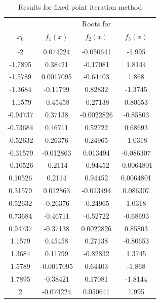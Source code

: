 \documentclass[11pt]{article}
\newcommand{\1}{\mathbbm{1}}
\begin{document}
	\begin{table}[H]
	\small
	\centering
	\begin{tabular}{c| c c c  }
		\hline
		\hline
				&\multicolumn{3}{c}{Roots for }\\
$x_{0}$      & $f_{1}(x)$      &$f_{2}(x)$      &$f_{3}(x)$      \\
\hline
&               &              &              \\
-2&      0.074224 &    -0.050641 &       -1.995 \\
-1.7895&       0.38421 &     -0.17081 &       1.8144 \\
-1.5789&     0.0017095 &     -0.64403 &        1.868 \\
-1.3684&      -0.11799 &      0.82832 &      -1.3745 \\
-1.1579&      -0.45458 &     -0.27138 &      0.80653 \\
-0.94737&       0.37138 &   -0.0022826 &     -0.85803 \\
-0.73684&       0.46711 &      0.52722 &      0.68693 \\
-0.52632&       0.26376 &      0.24965 &      -1.0318 \\
-0.31579&     -0.012863 &     0.013494 &    -0.086307 \\
-0.10526&       -0.2114 &     -0.94452 &   -0.0064801 \\
0.10526&        0.2114 &      0.94452 &    0.0064801 \\
0.31579&      0.012863 &    -0.013494 &     0.086307 \\
0.52632&      -0.26376 &     -0.24965 &       1.0318 \\
0.73684&      -0.46711 &     -0.52722 &     -0.68693 \\
0.94737&      -0.37138 &    0.0022826 &      0.85803 \\
1.1579&       0.45458 &      0.27138 &     -0.80653 \\
1.3684&       0.11799 &     -0.82832 &       1.3745 \\
1.5789&    -0.0017095 &      0.64403 &       -1.868 \\
1.7895&      -0.38421 &      0.17081 &      -1.8144 \\
2&     -0.074224 &     0.050641 &        1.995 \\
		\hline
		\hline
	\end{tabular} 
	\caption{Results for fixed point iteration method}
	\label{tab:3:4}
\end{table}
\end{document}
